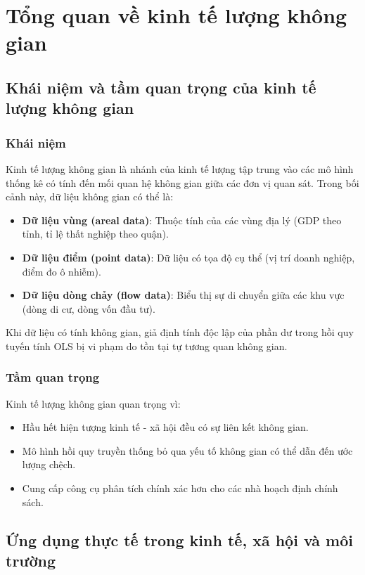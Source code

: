 \chapter{Tổng quan về kinh tế lượng không gian}
\section{Khái niệm và tầm quan trọng của kinh tế lượng không gian}
\subsection{Khái niệm}
Kinh tế lượng không gian là nhánh của kinh tế lượng tập trung vào các mô hình thống kê có tính đến mối quan hệ không gian giữa các đơn vị quan sát. Trong bối cảnh này, dữ liệu không gian có thể là:
\begin{itemize}
    \item \textbf{Dữ liệu vùng (areal data)}: Thuộc tính của các vùng địa lý (GDP theo tỉnh, tỉ lệ thất nghiệp theo quận).
    \item \textbf{Dữ liệu điểm (point data)}: Dữ liệu có tọa độ cụ thể (vị trí doanh nghiệp, điểm đo ô nhiễm).
    \item \textbf{Dữ liệu dòng chảy (flow data)}: Biểu thị sự di chuyển giữa các khu vực (dòng di cư, dòng vốn đầu tư).
\end{itemize}

Khi dữ liệu có tính không gian, giả định tính độc lập của phần dư trong hồi quy tuyến tính OLS bị vi phạm do tồn tại tự tương quan không gian.

\subsection{Tầm quan trọng}
Kinh tế lượng không gian quan trọng vì:
\begin{itemize}
    \item Hầu hết hiện tượng kinh tế - xã hội đều có sự liên kết không gian.
    \item Mô hình hồi quy truyền thống bỏ qua yếu tố không gian có thể dẫn đến ước lượng chệch.
    \item Cung cấp công cụ phân tích chính xác hơn cho các nhà hoạch định chính sách.
\end{itemize}

\section{Ứng dụng thực tế trong kinh tế, xã hội và môi trường}
